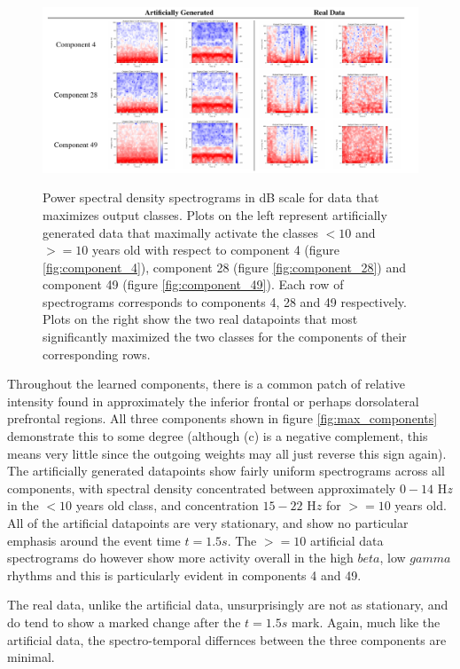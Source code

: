 \documentclass[fleqn,10pt]{wlscirep}
\begin{document}
\begin{figure}[ht]
  \caption{Power spectral density spectrograms in dB scale for data that maximizes output classes. Plots on the left represent artificially generated data that maximally activate the classes $<10$ and $>=10$ years old with respect to component 4 (figure \ref{fig:component_4}), component 28 (figure \ref{fig:component_28}) and component 49 (figure \ref{fig:component_49}). Each row of spectrograms corresponds to components 4, 28 and 49 respectively. Plots on the right show the two real datapoints that most significantly maximized the two classes for the components of their corresponding rows.}
  \centering\includegraphics[width=\linewidth]{spectrogram_tables.png}
 \label{fig:max_spectrograms}
\end{figure}

Throughout the learned components, there is a common patch of relative intensity found in approximately the inferior frontal or perhaps dorsolateral prefrontal regions. All three components shown in figure \ref{fig:max_components} demonstrate this to some degree (although (c) is a negative complement, this means very little since the outgoing weights may all just reverse this sign again). The artificially generated datapoints show fairly uniform spectrograms across all components, with spectral density concentrated between approximately $0-14$ H{\em z} in the $<10$ years old class, and concentration $15-22$ H$z$ for $>=10$ years old. All of the artificial datapoints are very stationary, and show no particular emphasis around the event time $t=1.5s$. The $>=10$ artificial data spectrograms do however show more activity overall in the high $beta$, low $gamma$ rhythms and this is particularly evident in components 4 and 49.

The real data, unlike the artificial data, unsurprisingly are not as stationary, and do tend to show a marked change after the $t=1.5s$ mark. Again, much like the artificial data, the spectro-temporal differnces between the three components are minimal.
\end{document}
